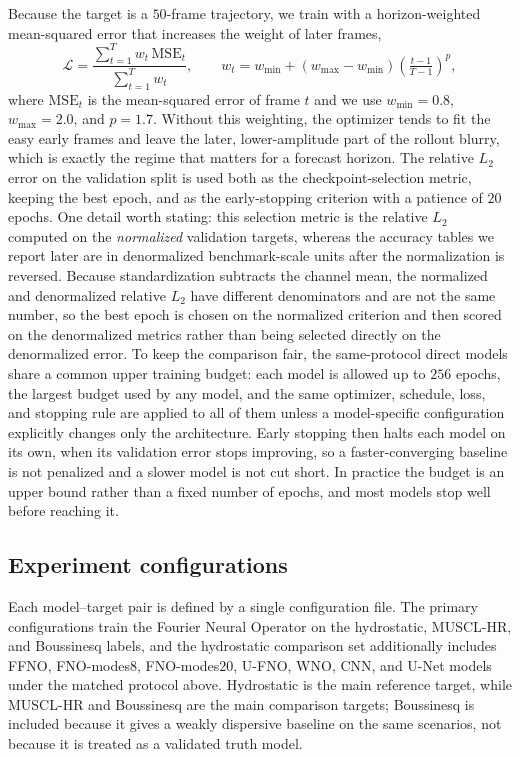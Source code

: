 Because the target is a $50$-frame trajectory, we train with a horizon-weighted mean-squared error that increases the weight of later frames,
\[
\mathcal{L} = \frac{\sum_{t = 1} ^ {T} w_t\, \mathrm{MSE}_t}{\sum_{t = 1} ^ {T} w_t},
\qquad
w_t = w_{\min} + (w_{\max} - w_{\min})\left(\tfrac{t - 1}{T - 1}\right) ^ {p},
\]
where $\mathrm{MSE}_t$ is the mean-squared error of frame $t$ and we use $w_{\min} = 0.8$, $w_{\max} = 2.0$, and $p = 1.7$. Without this weighting, the optimizer tends to fit the easy early frames and leave the later, lower-amplitude part of the rollout blurry, which is exactly the regime that matters for a forecast horizon. The relative $L_2$ error on the validation split is used both as the checkpoint-selection metric, keeping the best epoch, and as the early-stopping criterion with a patience of $20$ epochs. One detail worth stating: this selection metric is the relative $L_2$ computed on the \emph{normalized} validation targets, whereas the accuracy tables we report later are in denormalized benchmark-scale units after the normalization is reversed. Because standardization subtracts the channel mean, the normalized and denormalized relative $L_2$ have different denominators and are not the same number, so the best epoch is chosen on the normalized criterion and then scored on the denormalized metrics rather than being selected directly on the denormalized error. To keep the comparison fair, the same-protocol direct models share a common upper training budget: each model is allowed up to $256$ epochs, the largest budget used by any model, and the same optimizer, schedule, loss, and stopping rule are applied to all of them unless a model-specific configuration explicitly changes only the architecture. Early stopping then halts each model on its own, when its validation error stops improving, so a faster-converging baseline is not penalized and a slower model is not cut short. In practice the budget is an upper bound rather than a fixed number of epochs, and most models stop well before reaching it.

\subsection{Experiment configurations}
\label{subsec:train-configs}

Each model--target pair is defined by a single configuration file. The primary configurations train the Fourier Neural Operator on the hydrostatic, MUSCL-HR, and Boussinesq labels, and the hydrostatic comparison set additionally includes FFNO, FNO-modes8, FNO-modes20, U-FNO, WNO, CNN, and U-Net models under the matched protocol above. Hydrostatic is the main reference target, while MUSCL-HR and Boussinesq are the main comparison targets; Boussinesq is included because it gives a weakly dispersive baseline on the same scenarios, not because it is treated as a validated truth model.

